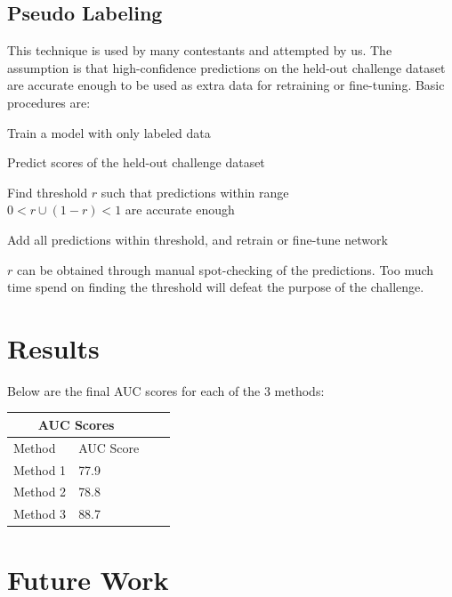 \documentclass[10pt,twocolumn,letterpaper]{article}
\newenvironment{alt_enumerate}
{ \begin{enumerate}
		\setlength{\itemsep}{1pt}
		\setlength{\parskip}{1pt}
		\setlength{\parsep}{1pt} }
	{ \end{enumerate} }
\begin{document}
\subsection{Pseudo Labeling}

This technique is used by many contestants and attempted by us. The
assumption is that high-confidence predictions on the held-out challenge
dataset are accurate enough to be used as extra data for retraining or
fine-tuning. Basic procedures are:

\begin{alt_enumerate}
	\item{Train a model with only labeled data}
	\item{Predict scores of the held-out challenge dataset}
	\item{Find threshold \(r\) such that predictions within range\\
		\(0<r \cup (1-r)<1\) are accurate enough}
	\item{Add all predictions within threshold, and retrain or fine-tune
		network}
\end{alt_enumerate}

\(r\) can be obtained through manual spot-checking of the predictions. Too
much time spend on finding the threshold will defeat the purpose of the
challenge.

\section{Results}

Below are the final AUC scores for each of the 3 methods:\\

\begin{tabular}{ |p{2cm}|p{2cm}|p{2cm}|p{2cm}| }
	\hline
	\multicolumn{2}{|c|}{AUC Scores}\\
	\hline
	Method & AUC Score\\
	\hline
	Method 1 & 77.9\\
	Method 2 & 78.8\\
	Method 3 & 88.7\\
	\hline
\end{tabular}

\section{Future Work}
\end{document}
